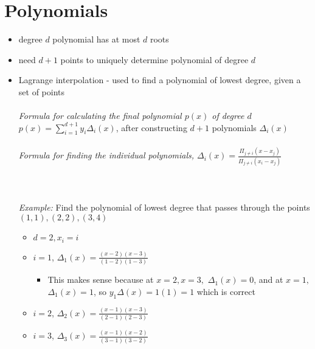 \documentclass[a4paper]{article}
\begin{document}
\section{Polynomials}
\begin{itemize}
        \item degree $d$ polynomial has at most $d$ roots
        \item need $d+1$ points to uniquely determine polynomial of degree $d$
        \item Lagrange interpolation - used to find a polynomial of lowest degree, given a set of points \\\\
        \textit{Formula for calculating the final polynomial $p(x)$ of degree $d$} \newline $p(x) = \sum_{i=1}^{d+1}y_i \Delta_i(x)$, after constructing $d+1$ polynomials $\Delta_i(x)$\\\\
        \textit{Formula for finding the individual polynomials, $\Delta_i(x) = \frac{\Pi_{j \neq i}(x - x_j)}{\Pi_{j \neq i}(x_i - x_j)}$} \\\\\\\\
        \textit{Example:}
        Find the polynomial of lowest degree that passes through the points $(1,1), (2,2), (3,4)$
        \begin{itemize}
            \item $d = 2, x_i = i$
            \item $i = 1$, $\Delta_1(x) = \frac{(x-2)(x - 3)}{(1-2)(1-3)}$ 
            \begin{itemize}
                \item This makes sense because at $x = 2, x= 3,$  $\Delta_1(x) = 0$, and at $x=1,$ $\Delta_1(x) = 1$, so $y_1\Delta(x) = 1(1) = 1$ which is correct
            \end{itemize}
            \item $i = 2$, $\Delta_2(x) = \frac{(x-1)(x - 3)}{(2-1)(2-3)}$
            \item $i = 3$, $\Delta_3(x) = \frac{(x-1)(x - 2)}{(3-1)(3-2)}$
        \end{itemize}
\end{itemize}
\end{document}
